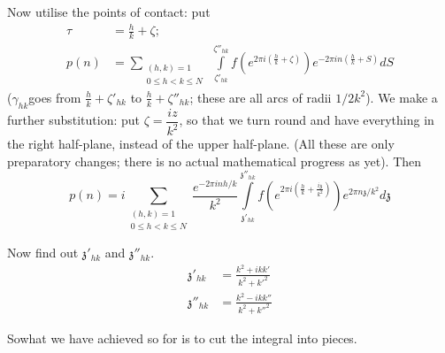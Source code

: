 Now utilise the points of contact: put
\begin{align*}
\tau & = \frac{h}{k} + \zeta;\\
p(n) & = \sum_{\substack{(h, k)=1\\ 0 \leq h < k \leq N}}~
\int\limits^{\zeta''_{hk}}_{\zeta'_{hk}} f(e^{2 \pi i (\frac{h}{k}+ \zeta)}) e^{- 2 \pi i
  n (\frac{h}{k} + S)}dS
\end{align*}
($\gamma_{hk}$\pageoriginale goes from $\frac{h}{k} + \zeta'_{hk}$ to $\frac{h}{k} +
\zeta''_{hk}$; these are all arcs of radii $1/2k^2$). We make a further
substitution: put $\zeta= \dfrac{i z}{k^2}$, so that we turn round and
have everything in the right half-plane, instead of the upper
half-plane. (All these are only preparatory changes; there is no
actual mathematical progress as yet). Then
$$
p(n) = i \sum_{\substack{(h, k)=1\\ 0 \leq h < k \leq N}} \frac{e^{- 2
    \pi i n h/k}}{k^2}
  \int\limits^{\mathfrak{z}''_{hk}}_{\mathfrak{z}'_{hk}} f(e^{2 \pi i
    (\frac{h}{k} + \frac{i \mathfrak{z}}{k^2})}) e^{2 \pi n
    \mathfrak{z}/k^2} d \mathfrak{z}
$$

Now find out $\mathfrak{z}'_{hk}$ and $\mathfrak{z}''_{hk}$.
\begin{align*}
  \mathfrak{z}'_{hk} & = \frac{k^2 + i k k'}{k^2+ k'^2}\\
  \mathfrak{z}''_{hk} & = \frac{k^2 - i k k''}{k^2 + k''^2}
\end{align*}

So\pageoriginale what we have achieved so for is to cut the integral into
pieces.

